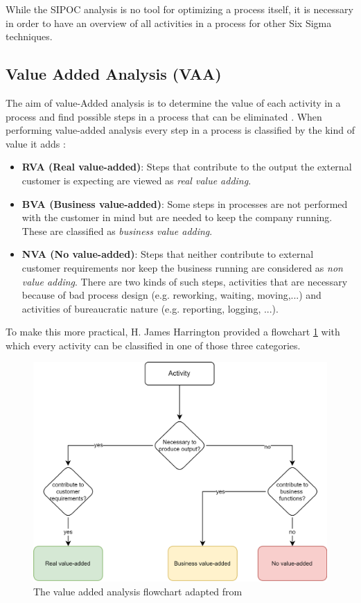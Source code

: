 While the SIPOC analysis is no tool for optimizing a process itself, it is necessary in order to have an overview of all activities in a process for other Six Sigma techniques. 

\subsection{Value Added Analysis (VAA)}\label{vaa}

The aim of value-Added analysis is to determine the value of each activity in a process and find possible steps in a process that can be eliminated \cite{fundamentals}\cite{harrington2016value}. When performing value-added analysis every step in a process is classified by the kind of value it adds \cite{harrington2016value}: 

\begin{itemize}
	\item \textbf{RVA (Real value-added)}: Steps that contribute to the output the external customer is expecting are viewed as \textit{real value adding}. 
	\item \textbf{BVA (Business value-added)}: Some steps in processes are not performed with the customer in mind but are needed to  keep the company running. These are classified as \textit{business value adding}.
	\item \textbf{NVA (No value-added)}: Steps that neither contribute to external customer requirements nor keep the business running are considered as \textit{non value adding}. There are two kinds of such steps, activities that are necessary because of bad process design (e.g. reworking, waiting, moving,...) and activities of bureaucratic nature (e.g. reporting, logging, ...).
\end{itemize}

To make this more practical, H. James Harrington provided a flowchart \ref{fig:VAA-flow} with which every activity can be classified in one of those three categories\cite{harrington2016value}.

\begin{figure}[H]
	\centering
	\includegraphics[width=0.8\columnwidth]{graphics/VAA}
	\caption{The value added analysis flowchart adapted from \cite{harrington2016value}} 
	\label{fig:VAA-flow} 
\end{figure}

